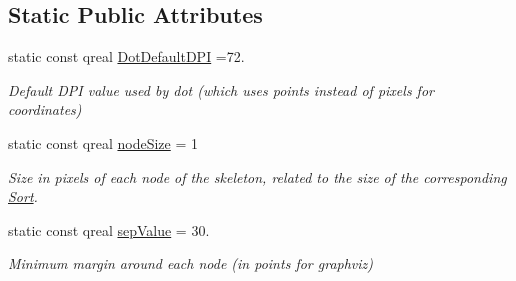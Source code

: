 \subsection*{Static Public Attributes}
\begin{DoxyCompactItemize}
\item 
\hypertarget{classGVSkeletonGraph_abb7b658c4700d007559323bc62e7c66d}{static const qreal \hyperlink{classGVSkeletonGraph_abb7b658c4700d007559323bc62e7c66d}{Dot\+Default\+D\+P\+I} =72.}\label{classGVSkeletonGraph_abb7b658c4700d007559323bc62e7c66d}

\begin{DoxyCompactList}\small\item\em Default D\+P\+I value used by dot (which uses points instead of pixels for coordinates) \end{DoxyCompactList}\item 
\hypertarget{classGVSkeletonGraph_ad9fe75a063cf1587f81fabeff392885e}{static const qreal \hyperlink{classGVSkeletonGraph_ad9fe75a063cf1587f81fabeff392885e}{node\+Size} = 1}\label{classGVSkeletonGraph_ad9fe75a063cf1587f81fabeff392885e}

\begin{DoxyCompactList}\small\item\em Size in pixels of each node of the skeleton, related to the size of the corresponding \hyperlink{classSort}{Sort}. \end{DoxyCompactList}\item 
\hypertarget{classGVSkeletonGraph_aa660fd51acdd78295969eeee3731339a}{static const qreal \hyperlink{classGVSkeletonGraph_aa660fd51acdd78295969eeee3731339a}{sep\+Value} = 30.}\label{classGVSkeletonGraph_aa660fd51acdd78295969eeee3731339a}

\begin{DoxyCompactList}\small\item\em Minimum margin around each node (in points for graphviz) \end{DoxyCompactList}\end{DoxyCompactItemize}
